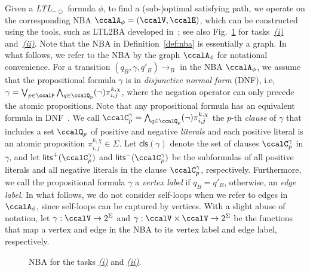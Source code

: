 \documentclass[Afour,sageh,times]{sagej}
\newcommand{\ltl}{ {\it LTL}$_{-\bigcirc}$ }
\newcommand{\autop}{\ccalA_{\phi}}
\renewcommand{\ap}[3]{\mathcal{\pi}_{{#1},{#2}}^{#3}}
\begin{document}
Given a \ltl formula $\phi$, to find a (sub-)optimal satisfying path, we operate on the corresponding NBA $\autop = (\ccalV, \ccalE)$, which can  be constructed using the tools, such as LTL2BA developed in~\cite{gastin2001fast}; see also Fig.~\ref{fig:nba_iii} for tasks~\hyperref[task:i]{\it (i)} and~\hyperref[task:ii]{\it (ii)}. Note that the NBA in Definition~\ref{def:nba} is essentially a graph. In what follows, we refer to the NBA by the graph $\autop$ for notational convenience. For a transition $(q_B, \gamma, q'_B)\to_B$ in the NBA $\autop$, we assume that the propositional formula $\gamma$ is  in {\it disjunctive normal form} (DNF), i.e,
 $ \gamma = \bigvee_{p\in \ccalP} \bigwedge_{q\in \ccalQ_p} (\neg)\ap{i}{j}{k,\chi}$, where the negation operator can only precede the atomic propositions. Note that any propositional formula has an equivalent formula in DNF~\cite{baier2008principles}. We call  $\ccalC_p^{\gamma}=\bigwedge_{q\in \ccalQ_p}(\neg) \ap{i}{j}{k,\chi}$ the $p$-th {\it clause} of $\gamma$ that includes a set $\ccalQ_p$ of positive and negative {\it literals} and each positive literal is an atomic proposition $\ap{i}{j}{k,\chi}\in \Sigma$. Let $\mathsf{cls}(\gamma)$ denote the set of clauses $\ccalC_p^{\gamma}$ in $\gamma$, and let $\mathsf{lits}^+(\ccalC_p^{\gamma})$ and $\mathsf{lits}^-(\ccalC_p^{\gamma})$ be the subformulas of all positive literals and all negative literals in the clause $\ccalC_p^\gamma$,  respectively.  Furthermore, we call the propositional formula $\gamma$ a {\it vertex label} if $q_B=q'_B$, otherwise, an {\it edge label}. In what follows, we do not consider self-loops when we refer to edges in $\autop$, since self-loops can be captured by vertices.   With a slight abuse of notation, let {$\gamma: \ccalV \to  2^\Sigma $} and {$\gamma: \ccalV \times \ccalV \to 2^\Sigma$} be the functions that map a vertex and edge in the NBA to its vertex label and edge label, respectively.
 \begin{figure}[!t]
   \centering
   \caption{NBA for the tasks \hyperref[task:i]{\it (i)} and \hyperref[task:ii]{\it (ii)}.}
   \label{fig:nba_iii}
 \end{figure}
\end{document}
